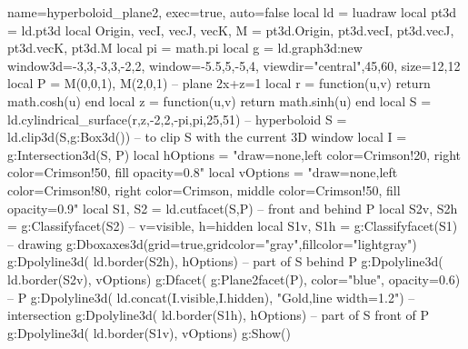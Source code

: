 \documentclass[border=5pt]{standalone}%
\begin{document}
\begin{luadraw}{name=hyperboloid_plane2, exec=true, auto=false}
local ld = luadraw
local pt3d = ld.pt3d
local Origin, vecI, vecJ, vecK, M = pt3d.Origin, pt3d.vecI, pt3d.vecJ, pt3d.vecK, pt3d.M
local pi = math.pi
local g = ld.graph3d:new{ window3d={-3,3,-3,3,-2,2}, window={-5.5,5,-5,4}, 
    viewdir={"central",45,60}, size={12,12}}
local P = {M(0,0,1), M(2,0,1)} -- plane 2x+z=1
local r = function(u,v) return math.cosh(u) end
local z = function(u,v) return math.sinh(u) end
local S = ld.cylindrical_surface(r,z,-2,2,-pi,pi,{25,51}) -- hyperboloid
S = ld.clip3d(S,g:Box3d()) -- to clip S with the current 3D window
local I = g:Intersection3d(S, P)
local hOptions = "draw=none,left color=Crimson!20, right color=Crimson!50, fill opacity=0.8"
local vOptions = "draw=none,left color=Crimson!80, right color=Crimson, middle color=Crimson!50, fill opacity=0.9"
local S1, S2 = ld.cutfacet(S,P) -- front and behind P
local S2v, S2h = g:Classifyfacet(S2) -- v=visible, h=hidden
local S1v, S1h = g:Classifyfacet(S1)
-- drawing
g:Dboxaxes3d({grid=true,gridcolor="gray",fillcolor="lightgray"})
g:Dpolyline3d( ld.border(S2h), hOptions) -- part of S behind P
g:Dpolyline3d( ld.border(S2v), vOptions)
g:Dfacet( g:Plane2facet(P), {color="blue", opacity=0.6}) -- P
g:Dpolyline3d( ld.concat(I.visible,I.hidden), "Gold,line width=1.2") -- intersection
g:Dpolyline3d( ld.border(S1h), hOptions) -- part of S front of P
g:Dpolyline3d( ld.border(S1v), vOptions)
g:Show()
\end{luadraw}
\end{document}
